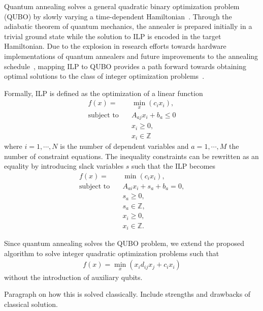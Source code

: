 \documentclass[prd,twocolumn,tightenlines,preprintnumbers,showpacs,superscriptaddress,notitlepage,nofootinbib,eqsecnum,floatfix,longbibliography]{revtex4}
\begin{document}
Quantum annealing solves a general quadratic binary optimization problem (QUBO) by slowly varying a time-dependent Hamiltonian~\cite{}. Through the adiabatic theorem of quantum mechanics, the annealer is prepared initially in a trivial ground state while the solution to ILP is encoded in the target Hamiltonian. Due to the explosion in research efforts towards hardware implementations of quantum annealers and future improvements to the annealing schedule~\cite{}, mapping ILP to QUBO provides a path forward towards obtaining optimal solutions to the class of integer optimization problems~\cite{2018Glover}.

Formally, ILP is defined as the optimization of a linear function
\begin{align}
f(x) = &\min\limits_{x}(c_i x_i),\\
\textrm{subject to} \quad & A_{aj}x_i +b_a \leq 0 \\
& x_i \geq 0,\\
& x_i \in \mathbb{Z}
\end{align}
where $i=1, \cdots,  N$ is the number of dependent variables and $a=1, \cdots, M$ the number of constraint equations. The inequality constraints can be rewritten as an equality by introducing slack variables $s$ such that the ILP becomes
\begin{align}
f(x) = &\min(c_i x_i),\\
\textrm{subject to} \quad & A_{a i}x_i + s_a + b_a = 0,\\
& s_a \geq 0,\\
& s_a \in \mathbb{Z},\\
& x_i \geq 0,\\
& x_i \in \mathbb{Z}.
\end{align}

Since quantum annealing solves the QUBO problem, we extend the proposed algorithm to solve integer quadratic optimization problems such that
\begin{align}
f(x) = \min\limits_{x}(x_i d_{ij} x_j + c_i x_i)
\end{align}
without the introduction of auxiliary qubits.

{\color{red} Paragraph on how this is solved classically. Include strengths and drawbacks of classical solution.}
\end{document}

